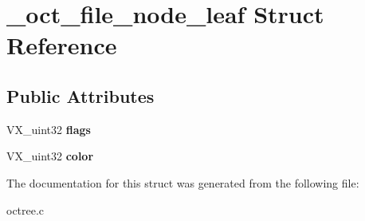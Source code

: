 \hypertarget{struct__oct__file__node__leaf}{\section{\-\_\-oct\-\_\-file\-\_\-node\-\_\-leaf Struct Reference}
\label{struct__oct__file__node__leaf}
}
\subsection*{Public Attributes}
\begin{DoxyCompactItemize}
\item 
\hypertarget{struct__oct__file__node__leaf_a6e14565fdd6fd23d11a3e4a63f7221bc}{V\-X\-\_\-uint32 {\bfseries flags}}\label{struct__oct__file__node__leaf_a6e14565fdd6fd23d11a3e4a63f7221bc}

\item 
\hypertarget{struct__oct__file__node__leaf_aaa3c5ee6cd984a337c237650ec320cca}{V\-X\-\_\-uint32 {\bfseries color}}\label{struct__oct__file__node__leaf_aaa3c5ee6cd984a337c237650ec320cca}

\end{DoxyCompactItemize}


The documentation for this struct was generated from the following file\-:\begin{DoxyCompactItemize}
\item 
octree.\-c\end{DoxyCompactItemize}
